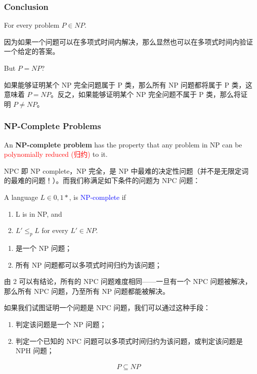 \documentclass{article}
\begin{document}
\subsubsection{Conclusion}
For every problem $ P \in NP $.\par
因为如果一个问题可以在多项式时间内解决，那么显然也可以在多项式时间内验证一个给定的答案。\par
But  $ P  =  NP $?\par
如果能够证明某个 NP 完全问题属于 P 类，那么所有 NP 问题都将属于 P 类，这意味着 $P = NP$。反之，如果能够证明某个 NP 完全问题不属于 P 类，那么将证明 $P \neq NP $。

\subsubsection{NP-Complete Problems}

An \textbf{NP-complete problem} has the property that any problem in NP can be \textcolor{red}{polynomially reduced (归约)} to it.\par

NPC 即 NP complete，NP 完全，是 NP 中最难的决定性问题（并不是无限定词的最难的问题！）。而我们称满足如下条件的问题为 NPC 问题：\par
A language $L \in {0,1}*$, is \textcolor{blue}{NP-complete} if
\begin{enumerate}
    \item L is in NP, and
    \item $L' \le_p L$ for every $L' \in NP$.
\end{enumerate}

\begin{enumerate}
    \item 是一个 NP 问题；
    \item 所有 NP 问题都可以多项式时间归约为该问题；
\end{enumerate}

由 2 可以有结论，所有的 NPC 问题难度相同——一旦有一个 NPC 问题被解决，那么所有 NPC 问题，乃至所有 NP 问题都能被解决。\par
如果我们试图证明一个问题是 NPC 问题，我们可以通过这种手段：\par
\begin{enumerate}
    \item 判定该问题是一个 NP 问题；
    \item 判定一个已知的 NPC 问题可以多项式时间归约为该问题，或判定该问题是 NPH 问题；
\end{enumerate}

\begin{align*}
    P \subseteq NP
\end{align*}
\end{document}
